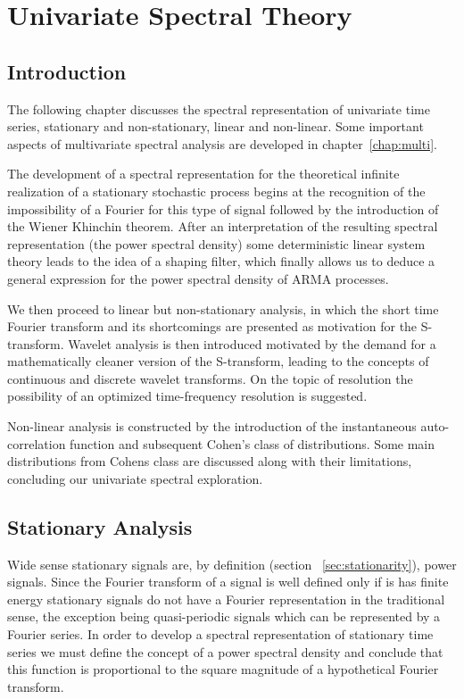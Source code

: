 \chapter{Univariate Spectral Theory}\label{chap:spectral_analysis}

\section*{Introduction}

The following chapter discusses the spectral representation of univariate time
series, stationary and non-stationary, linear and non-linear. Some important
aspects of multivariate spectral analysis are developed in
chapter~\ref{chap:multi}.

The development of a spectral representation for the theoretical infinite
realization of a stationary stochastic process begins at the recognition of the
impossibility of a Fourier for this type of signal followed by the introduction
of the Wiener Khinchin theorem. After an interpretation of the resulting
spectral representation (the power spectral density) some deterministic linear
system theory leads to the idea of a shaping filter, which finally allows us to
deduce a general expression for the power spectral density of ARMA processes.

We then proceed to linear but non-stationary analysis, in which the short time
Fourier transform and its shortcomings are presented as motivation for the
S-transform. Wavelet analysis is then introduced motivated by the demand for a
mathematically cleaner version of the S-transform, leading to the concepts of
continuous and discrete wavelet transforms. On the topic of resolution the
possibility of an optimized time-frequency resolution is suggested.

Non-linear analysis is constructed by the introduction of the instantaneous
auto-correlation function and subsequent Cohen's class of distributions. Some
main distributions from Cohens class are discussed along with their
limitations, concluding our univariate spectral exploration.

\section{Stationary Analysis}

Wide sense stationary signals are, by definition (section
~\ref{sec:stationarity}), power signals. Since the Fourier transform of a
signal is well defined only if is has finite energy stationary signals do not
have a Fourier representation in the traditional sense, the exception being
quasi-periodic signals which can be represented by a Fourier series. In order
to develop a spectral representation of stationary time series we must define
the concept of a power spectral density and conclude that this function is
proportional to the square magnitude of a hypothetical Fourier transform.

